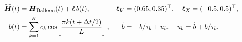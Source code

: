 \documentclass[12pt]{article}
\begin{document}
\fontsize{22}{28}\selectfont\[\begin{aligned} \widehat{\boldsymbol H}(t)&=\boldsymbol H_{\rm Balloon}(t)+\boldsymbol\ell\,b(t),& \boldsymbol\ell_V&=(0.65,0.35)^\top,\quad\boldsymbol\ell_X=(-0.5,0.5)^\top,\\ b(t)&=\sum_{k=1}^{K}c_k\cos\!\left[\frac{\pi k(t+\Delta t/2)}{L}\right],& \dot b&=-b/\tau_b+u_b,\quad u_b=\dot b+b/\tau_b.\end{aligned}\]
\end{document}
